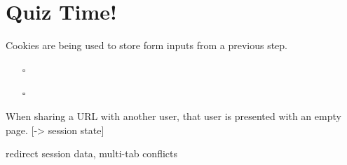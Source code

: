 \documentclass{beamer}
\begin{document}
\section{Quiz Time!}
\begin{frame}





\end{frame}

\begin{frame}
  Cookies are being used to store form inputs from a previous step.
  \begin{itemize}
    \item[$\square$] 
    \item[$\square$] 
  \end{itemize}
\end{frame}

\begin{frame}
  When sharing a URL with another user, that user is presented with an empty page.
  [-> session state]
\end{frame}

\begin{frame}
  redirect session data, multi-tab conflicts
\end{frame}
\end{document}
